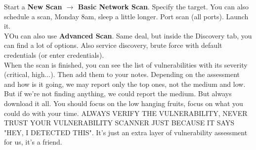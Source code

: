 \documentclass[11pt,a4paper]{article}
\begin{document}
Start a \textbf{New Scan $\rightarrow$ Basic Network Scan}. Specify the target. You can also schedule a scan, Monday 8am, sleep a little longer. Port scan (all ports). Launch it.\\

YOu can also use \textbf{Advanced Scan}. Same deal, but inside the Discovery tab, you can find a lot of options. Also service discovery, brute force with default credentials (or enter credentials).\\

When the scan is finished, you can see the list of vulnerabilities with its severity (critical, high...). Then add them to your notes. Depending on the assessment and how is it going, we may report only the top ones, not the medium and low. But if we're not finding anything, we could report the medium. But always download it all. You should focus on the low hanging fruits, focus on what you could do with your time. ALWAYS VERIFY THE VULNERABILITY, NEVER TRUST YOUR VULNERABILITY SCANNER JUST BECAUSE IT SAYS "HEY, I DETECTED THIS". It's just an extra layer of vulnerability assessment for us, it's a friend.
\end{document}
